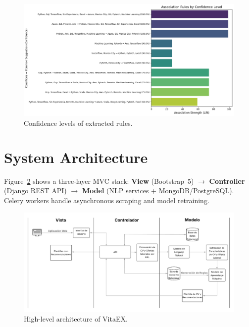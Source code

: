 \documentclass[runningheads]{llncs}
\begin{document}
	 \begin{figure}[H]
		     \centering
		     \includegraphics[width=0.9\linewidth]{imagenes/confidence_distribution.png}
		     \caption{Confidence levels of extracted rules.}
		     \label{fig:confidence_distribution}
		 \end{figure}
	
	
	\section{System Architecture}
	Figure~\ref{fig:blocks} shows a three-layer MVC stack: \textbf{View} (Bootstrap~5) $\rightarrow$ \textbf{Controller} (Django REST API) $\rightarrow$ \textbf{Model} (NLP services + MongoDB/PostgreSQL). Celery workers handle asynchronous scraping and model retraining.
	
	\begin{figure}[H]
		\centering
		\includegraphics[width=1\linewidth]{imagenes/Arquitectura_Sistema.png}
		\caption{High-level architecture of VitaEX.}
		\label{fig:blocks}
	\end{figure}
\end{document}
